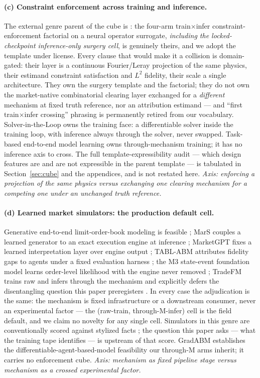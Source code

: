 \paragraph{(c) Constraint enforcement across training and inference.}
The external genre parent of the cube is \citet{duruisseaux2024}: the
four-arm train$\times$infer constraint-enforcement factorial on a neural
operator surrogate, \emph{including the locked-checkpoint inference-only
surgery cell}, is genuinely theirs, and we adopt the template under license.
Every clause that would make it a collision is domain-gated: their layer is
a continuous Fourier/Leray projection of the same physics, their estimand
constraint satisfaction and $L^{2}$ fidelity, their scale a single
architecture. They own the surgery template and the factorial; they do not
own the market-native combinatorial clearing layer exchanged for a
\emph{different} mechanism at fixed truth reference, nor an attribution
estimand --- and ``first train$\times$infer crossing'' phrasing is
permanently retired from our vocabulary. Solver-in-the-Loop
\citep{solverinloop2020} owns the training face: a differentiable solver
inside the training loop, with inference always through the solver, never
swapped. Task-based end-to-end model learning \citep{taskbased2017} owns
through-mechanism training; it has no inference axis to cross. The full
template-expressibility audit --- which design features are and are not
expressible in the parent template --- is tabulated in
Section~\ref{sec:cube} and the appendices, and is not restated here.
\emph{Axis: enforcing a projection of the same physics versus exchanging
one clearing mechanism for a competing one under an unchanged truth
reference.}

\paragraph{(d) Learned market simulators: the production default cell.}
Generative end-to-end limit-order-book modeling is feasible
\citep{nagy2023}; MarS couples a learned generator to an exact execution
engine at inference \citep{mars2024}; MarketGPT fixes a learned
interpretation layer over engine output \citep{marketgpt2024}; TABL-ABM
attributes fidelity gaps to agents under a fixed evaluation harness
\citep{tablabm2025}; the M3 state-event foundation model learns order-level
likelihood with the engine never removed \citep{m3_2026}; TradeFM trains
raw and infers through the mechanism and explicitly defers the disentangling
question this paper preregisters \citep{tradefm2026}. In every case the
adjudication is the same: the mechanism is fixed infrastructure or a
downstream consumer, never an experimental factor --- the (raw-train,
through-M-infer) cell is the field default, and we claim no novelty for any
single cell. Simulators in this genre are conventionally scored against
stylized facts \citep{cont2001}; the question this paper asks --- what the
training tape identifies --- is upstream of that score. GradABM
\citep{chopra2023} establishes the differentiable-agent-based-model
feasibility our through-M arms inherit; it carries no enforcement cube.
\emph{Axis: mechanism as fixed pipeline stage versus mechanism as a crossed
experimental factor.}

